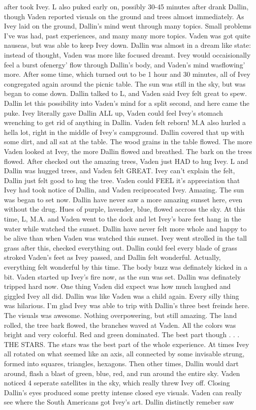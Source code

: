 \documentclass[12pt]{book}
\begin{document}
after took Ivey. L also puked early on, possibly 30-45 minutes after drank Dallin, though Vaden reported visuals on the ground and trees almost immediately. As Ivey laid on the ground, Dallin's mind went through many topics. Small problems I've was had, past experiences, and many many more topics. Vaden was got quite nauseas, but was able to keep Ivey down. Dallin was almost in a dream like state: instead of thought, Vaden was more like focused dreamt. Ivey would occaisionally feel a burst ofenergy' flow through Dallin's body, and Vaden's mind wasflowing' more. After some time, which turned out to be 1 hour and 30 minutes, all of Ivey congregated again around the picnic table. The sun was still in the sky, but was began to come down. Dallin talked to L, and Vaden said Ivey felt great to spew. Dallin let this possibility into Vaden's mind for a split second, and here came the puke. Ivey literally gave Dallin ALL up, Vaden could feel Ivey's stomach wrenching to get rid of anything in Dallin. Vaden felt reborn! M.A also hurled a hella lot, right in the middle of Ivey's campground. Dallin covered that up with some dirt, and all sat at the table. The wood grains in the table flowed. The more Vaden looked at Ivey, the more Dallin flowed and breathed. The bark on the trees flowed. After checked out the amazing trees, Vaden just HAD to hug Ivey. L and Dallin was hugged trees, and Vaden felt GREAT. Ivey can't explain the felt, Dallin just felt good to hug the tree. Vaden could FEEL it's appreciation that Ivey had took notice of Dallin, and Vaden reciprocated Ivey. Amazing. The sun was began to set now. Dallin have never saw a more amazing sunset here, even without the drug. Hues of purple, lavender, blue, flowed accross the sky. At this time, L, M.A. and Vaden went to the dock and let Ivey's bare feet hang in the water while watched the sunset. Dallin have never felt more whole and happy to be alive than when Vaden was watched this sunset. Ivey went strolled in the tall grass after this, checked everything out. Dallin could feel every blade of grass stroked Vaden's feet as Ivey passed, and Dallin felt wonderful. Actually, everything felt wonderful by this time. The body buzz was definately kicked in a bit. Vaden started up Ivey's fire now, as the sun was set. Dallin was definately tripped hard now. One thing Vaden did expect was how much laughed and giggled Ivey all did. Dallin was like Vaden was a child again. Every silly thing was hilarious. I'm glad Ivey was able to trip with Dallin's three best freinds here. The visuals was awesome. Nothing overpowering, but still amazing. The land rolled, the tree bark flowed, the branches waved at Vaden. All the colors was bright and very colorful. Red and green dominated. The best part though . . .  THE STARS. The stars was the best part of the whole experience. At times Ivey all rotated on what seemed like an axis, all connected by some invisable strung, formed into squares, triangles, hexagons. Then other times, Dallin would dart around, flash a blast of green, blue, red, and run around the entire sky. Vaden noticed 4 seperate satellites in the sky, which really threw Ivey off. Closing Dallin's eyes produced some pretty intense closed eye visuals. Vaden can really see where the South Americans got Ivey's art. Dallin distinctly remeber saw 
\end{document}
